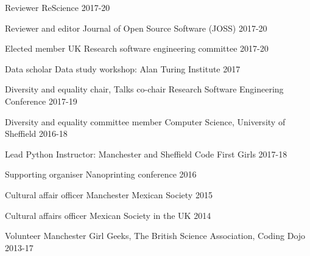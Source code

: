 \begin{cvpress}
\cvpres
{Reviewer} %
{ReScience} %
{2017-20} %


\cvpres
{Reviewer and editor} %
{Journal of Open Source Software (JOSS)} %
{2017-20} %



\cvpres
{Elected member} %
{UK Research software engineering committee} %
{2017-20} %

\cvpres
{Data scholar} %
{Data study workshop: Alan Turing Institute} %
{2017} %


\cvpres
{Diversity and equality chair, Talks co-chair} %
{Research Software Engineering Conference} %
{2017-19} %


\cvpres
{Diversity and equality committee member} %
{Computer Science, University of Sheffield} %
{2016-18} %


\cvpres
{Lead Python Instructor: Manchester and Sheffield} %
{Code First Girls} %
{2017-18} %



\cvpres
{Supporting organiser} %
{Nanoprinting conference} %
{2016} %


\cvpres
{Cultural affair officer}
{Manchester Mexican Society}
{2015}

\cvpres
{Cultural affairs officer}
{Mexican Society in the UK}
{2014}


\cvpres
{Volunteer} %
{Manchester Girl Geeks, The British Science Association, Coding Dojo} %
{2013-17} %


\end{cvpress}